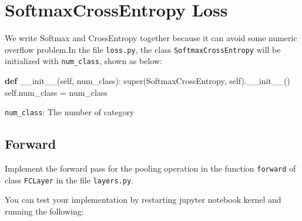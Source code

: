 \documentclass[11pt]{article}
\newenvironment{Shaded}{}{}
\newcommand{\KeywordTok}[1]{\textcolor[rgb]{0.00,0.44,0.13}{\textbf{{#1}}}}
\newcommand{\FunctionTok}[1]{\textcolor[rgb]{0.02,0.16,0.49}{{#1}}}
\newcommand{\NormalTok}[1]{{#1}}
\newcommand{\VariableTok}[1]{\textcolor[rgb]{0.10,0.09,0.49}{{#1}}}
\newcommand{\OperatorTok}[1]{\textcolor[rgb]{0.40,0.40,0.40}{{#1}}}
\newcommand{\BuiltInTok}[1]{{#1}}
\begin{document}
    \section{SoftmaxCrossEntropy Loss}\label{softmaxcrossentropy-loss}

We write Softmax and CrossEntropy together because it can avoid some
numeric overflow problem.In the file \texttt{loss.py}, the class
\texttt{SoftmaxCrossEntropy} will be initialized with
\texttt{num\_class}, shown as below:

\begin{Shaded}
\begin{Highlighting}[]
\KeywordTok{def} \FunctionTok{__init__}\NormalTok{(}\VariableTok{self}\NormalTok{, num_class):}
        \BuiltInTok{super}\NormalTok{(SoftmaxCrossEntropy, }\VariableTok{self}\NormalTok{).}\FunctionTok{__init__}\NormalTok{()}
        \VariableTok{self}\NormalTok{.num_class }\OperatorTok{=}\NormalTok{ num_class}
\end{Highlighting}
\end{Shaded}

\texttt{num\_class}: The number of category

    \subsection{Forward}\label{forward}

Implement the forward pass for the pooling operation in the function
\texttt{forward} of class \texttt{FCLayer} in the file
\texttt{layers.py}.

You can test your implementation by restarting jupyter notebook kernel
and running the following:
\end{document}
